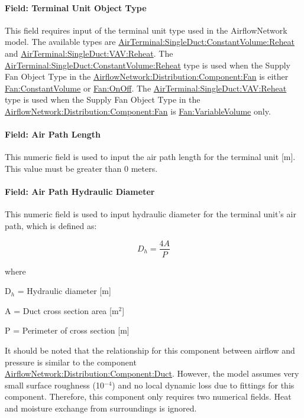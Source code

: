 \paragraph{Field: Terminal Unit Object Type}\label{field-terminal-unit-object-type}

This field requires input of the terminal unit type used in the AirflowNetwork model. The available types are \hyperref[airterminalsingleductconstantvolumereheat]{AirTerminal:SingleDuct:ConstantVolume:Reheat} and \hyperref[airterminalsingleductvavreheat]{AirTerminal:SingleDuct:VAV:Reheat}. The \hyperref[airterminalsingleductconstantvolumereheat]{AirTerminal:SingleDuct:ConstantVolume:Reheat} type is used when the Supply Fan Object Type in the \hyperref[airflownetworkdistributioncomponentfan]{AirflowNetwork:Distribution:Component:Fan} is either \hyperref[fanconstantvolume]{Fan:ConstantVolume} or \hyperref[fanonoff]{Fan:OnOff}. The \hyperref[airterminalsingleductvavreheat]{AirTerminal:SingleDuct:VAV:Reheat} type is used when the Supply Fan Object Type in the \hyperref[airflownetworkdistributioncomponentfan]{AirflowNetwork:Distribution:Component:Fan} is \hyperref[fanvariablevolume]{Fan:VariableVolume} only.

\paragraph{Field: Air Path Length}\label{field-air-path-length-2}

This numeric field is used to input the air path length for the terminal unit {[}m{]}. This value must be greater than 0 meters.

\paragraph{Field: Air Path Hydraulic Diameter}\label{field-air-path-hydraulic-diameter-2}

This numeric field is used to input hydraulic diameter for the terminal unit's air path, which is defined as:

\begin{equation}
{D_h} = \frac{{4A}}{P}
\end{equation}

where

D\(_{h}\) = Hydraulic diameter {[}m{]}

A = Duct cross section area {[}m\(^{2}\){]}

P = Perimeter of cross section {[}m{]}

It should be noted that the relationship for this component between airflow and pressure is similar to the component \hyperref[airflownetworkdistributioncomponentduct]{AirflowNetwork:Distribution:Component:Duct}. However, the model assumes very small surface roughness (10\(^{-4}\)) and no local dynamic loss due to fittings for this component. Therefore, this component only requires two numerical fields. Heat and moisture exchange from surroundings is ignored.

